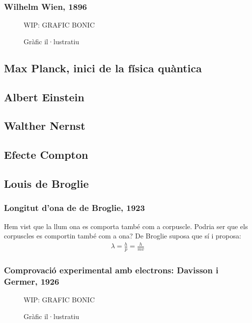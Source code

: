 \subsubsection*{Wilhelm Wien, 1896}
\begin{figure}[H]
\centering
    WIP: GRAFIC BONIC 
\caption{Gràfic il·lustratiu}
\end{figure}

\subsection{Max Planck, inici de la física quàntica}

\subsection{Albert Einstein}

\subsection{Walther Nernst}

\subsection{Efecte Compton}

\subsection{Louis de Broglie}
\subsubsection*{Longitut d'ona de de Broglie, 1923}
Hem vist que la llum ona es comporta també com a corpuscle. Podria ser que els corpuscles es comportin també com a ona? De Broglie suposa que sí i proposa:
\begin{align}
    \lambda = \frac{h}{p} = \frac {h}{mv}
\end{align}

\subsubsection*{Comprovació experimental amb electrons: Davisson i Germer, 1926}
\begin{figure}[H]
\centering
    WIP: GRAFIC BONIC 
\caption{Gràfic il·lustratiu}
\end{figure}

